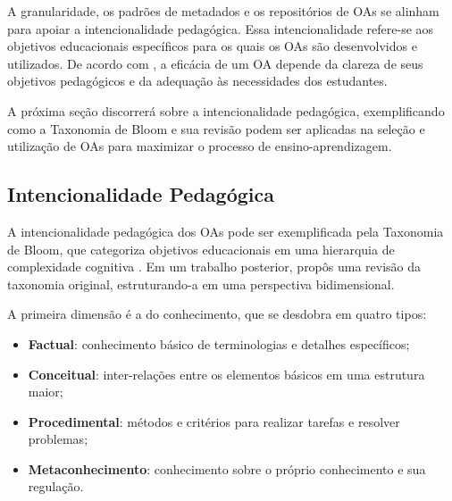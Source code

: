 
A granularidade, os padrões de metadados e os repositórios de OAs se alinham para apoiar a intencionalidade pedagógica. Essa intencionalidade refere-se aos objetivos educacionais específicos para os quais os OAs são desenvolvidos e utilizados. De acordo com , a eficácia de um OA depende da clareza de seus objetivos pedagógicos e da adequação às necessidades dos estudantes.

A próxima seção discorrerá sobre a intencionalidade pedagógica, exemplificando como a Taxonomia de Bloom e sua revisão podem ser aplicadas na seleção e utilização de OAs para maximizar o processo de ensino-aprendizagem.

\subsection{Intencionalidade Pedagógica}

A intencionalidade pedagógica dos OAs pode ser exemplificada pela Taxonomia de Bloom, que categoriza objetivos educacionais em uma hierarquia de complexidade cognitiva \cite{Bloom1984}. Em um trabalho posterior,  propôs uma revisão da taxonomia original, estruturando-a em uma perspectiva bidimensional. 

A primeira dimensão é a do conhecimento, que se desdobra em quatro tipos:

\begin{itemize}
    \item \textbf{Factual}: conhecimento básico de terminologias e detalhes específicos;
    \item \textbf{Conceitual}: inter-relações entre os elementos básicos em uma estrutura maior;
    \item \textbf{Procedimental}: métodos e critérios para realizar tarefas e resolver problemas;
    \item \textbf{Metaconhecimento}: conhecimento sobre o próprio conhecimento e sua regulação.
\end{itemize}

